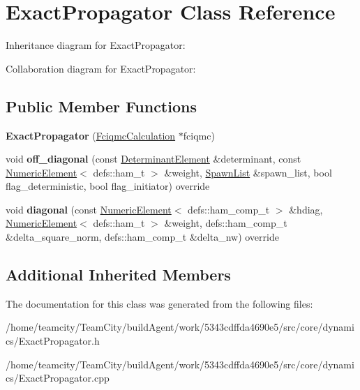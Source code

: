 \hypertarget{classExactPropagator}{}\section{Exact\+Propagator Class Reference}
\label{classExactPropagator}


Inheritance diagram for Exact\+Propagator\+:


Collaboration diagram for Exact\+Propagator\+:
\subsection*{Public Member Functions}
\begin{DoxyCompactItemize}
\item 
{\bfseries Exact\+Propagator} (\hyperlink{classFciqmcCalculation}{Fciqmc\+Calculation} $\ast$fciqmc)\hypertarget{classExactPropagator_a92e82e76311ae33ca8923dc62f75681c}{}\label{classExactPropagator_a92e82e76311ae33ca8923dc62f75681c}

\item 
void {\bfseries off\+\_\+diagonal} (const \hyperlink{classDeterminantElement}{Determinant\+Element} \&determinant, const \hyperlink{classNumericElement}{Numeric\+Element}$<$ defs\+::ham\+\_\+t $>$ \&weight, \hyperlink{structSpawnList}{Spawn\+List} \&spawn\+\_\+list, bool flag\+\_\+deterministic, bool flag\+\_\+initiator) override\hypertarget{classExactPropagator_abf77c975186a42ce705420706e675150}{}\label{classExactPropagator_abf77c975186a42ce705420706e675150}

\item 
void {\bfseries diagonal} (const \hyperlink{classNumericElement}{Numeric\+Element}$<$ defs\+::ham\+\_\+comp\+\_\+t $>$ \&hdiag, \hyperlink{classNumericElement}{Numeric\+Element}$<$ defs\+::ham\+\_\+t $>$ \&weight, defs\+::ham\+\_\+comp\+\_\+t \&delta\+\_\+square\+\_\+norm, defs\+::ham\+\_\+comp\+\_\+t \&delta\+\_\+nw) override\hypertarget{classExactPropagator_a3c34937011afc40435b9a75d1345b101}{}\label{classExactPropagator_a3c34937011afc40435b9a75d1345b101}

\end{DoxyCompactItemize}
\subsection*{Additional Inherited Members}


The documentation for this class was generated from the following files\+:\begin{DoxyCompactItemize}
\item 
/home/teamcity/\+Team\+City/build\+Agent/work/5343cdffda4690e5/src/core/dynamics/Exact\+Propagator.\+h\item 
/home/teamcity/\+Team\+City/build\+Agent/work/5343cdffda4690e5/src/core/dynamics/Exact\+Propagator.\+cpp\end{DoxyCompactItemize}
